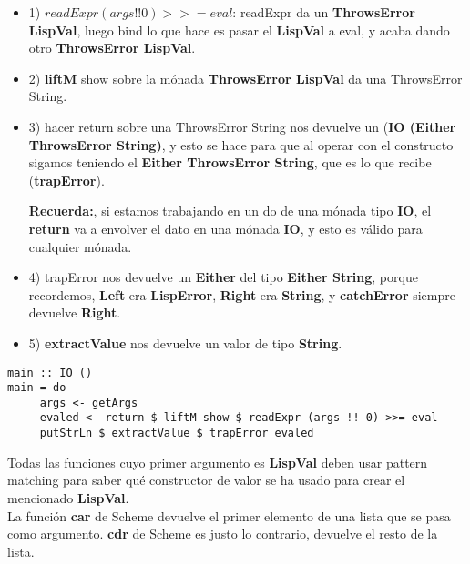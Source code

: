 \begin{itemize}

\item 1) $readExpr (args !! 0) >>= eval$: readExpr da un \textbf{ThrowsError LispVal}, luego bind lo que hace es pasar el \textbf{LispVal} a eval, y acaba dando otro \textbf{ThrowsError LispVal}.

\item 2) \textbf{liftM} show sobre la m\'onada \textbf{ThrowsError LispVal} da una ThrowsError String.

\item 3) hacer return sobre una ThrowsError String nos devuelve un (\textbf{IO (Either ThrowsError String)}, y esto se hace para que al operar con el constructo \textbf{\<\-} sigamos teniendo el \textbf{Either ThrowsError String}, que es lo que recibe (\textbf{trapError}).

\textbf{Recuerda:}, si estamos trabajando en un do de una m\'onada tipo \textbf{IO}, el \textbf{return} va a envolver el dato en una m\'onada \textbf{IO}, y esto es v\'alido para cualquier m\'onada.

\item 4) trapError nos devuelve un \textbf{Either} del tipo \textbf{Either String}, porque recordemos, \textbf{Left} era \textbf{LispError}, \textbf{Right} era \textbf{String}, y \textbf{catchError} siempre devuelve \textbf{Right}.

\item 5) \textbf{extractValue} nos devuelve un valor de tipo \textbf{String}.
\end{itemize}

\begin{minipage}{\linewidth}
\begin{small}
\begin{lstlisting}[frame=single]
main :: IO ()
main = do
     args <- getArgs
     evaled <- return $ liftM show $ readExpr (args !! 0) >>= eval
     putStrLn $ extractValue $ trapError evaled
\end{lstlisting}
\end{small}
\end{minipage}

Todas las funciones cuyo primer argumento es \textbf{LispVal} deben usar pattern matching para saber qu\'e constructor de valor se ha usado para crear el mencionado \textbf{LispVal}.\\

La funci\'on \textbf{car} de Scheme devuelve el primer elemento de una lista que se pasa como argumento. \textbf{cdr} de Scheme es justo lo contrario, devuelve el resto de la lista.\\

